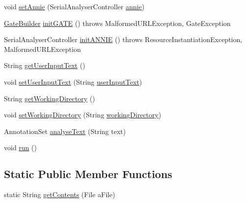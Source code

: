 \begin{DoxyCompactItemize}
\item 
void \hyperlink{classcom_1_1poly_1_1nlp_1_1filekommander_1_1_file_kommander_a806dc8c2cb8521b9d76fb9858ec65085}{set\-Annie} (Serial\-Analyser\-Controller \hyperlink{classcom_1_1poly_1_1nlp_1_1filekommander_1_1_file_kommander_a5c3ff51dc7f068e9442618b7c2ab1810}{annie})
\item 
\hyperlink{classcom_1_1poly_1_1nlp_1_1filekommander_1_1gate_1_1_gate_builder}{Gate\-Builder} \hyperlink{classcom_1_1poly_1_1nlp_1_1filekommander_1_1_file_kommander_a423e5f5fb6b4f6c36f04d1e91de943e6}{init\-G\-A\-T\-E} ()  throws Malformed\-U\-R\-L\-Exception, Gate\-Exception 
\item 
Serial\-Analyser\-Controller \hyperlink{classcom_1_1poly_1_1nlp_1_1filekommander_1_1_file_kommander_aab36d3608bc89c1e99b3db5483641415}{init\-A\-N\-N\-I\-E} ()  throws Resource\-Instantiation\-Exception, Malformed\-U\-R\-L\-Exception 
\item 
String \hyperlink{classcom_1_1poly_1_1nlp_1_1filekommander_1_1_file_kommander_a89817ce8554641ad3cb7c003533a335d}{get\-User\-Input\-Text} ()
\item 
void \hyperlink{classcom_1_1poly_1_1nlp_1_1filekommander_1_1_file_kommander_adf1a1371e27da05aa4f5125b6a3aa33c}{set\-User\-Input\-Text} (String \hyperlink{classcom_1_1poly_1_1nlp_1_1filekommander_1_1_file_kommander_a499151b0f39dbce7b82a811c8cf21402}{user\-Input\-Text})
\item 
String \hyperlink{classcom_1_1poly_1_1nlp_1_1filekommander_1_1_file_kommander_abc3cb01bcd0a28c9e690249a8caf816b}{get\-Working\-Directory} ()
\item 
void \hyperlink{classcom_1_1poly_1_1nlp_1_1filekommander_1_1_file_kommander_a0b72ce095e3d98ae752e6ab9b0b8a1d5}{set\-Working\-Directory} (String \hyperlink{classcom_1_1poly_1_1nlp_1_1filekommander_1_1_file_kommander_a862ebb1796e89d0d83d348797e7c6472}{working\-Directory})
\item 
Annotation\-Set \hyperlink{classcom_1_1poly_1_1nlp_1_1filekommander_1_1_file_kommander_a1cf5ac4a3ebfd468ca38656a9d1bd0b9}{analyse\-Text} (String text)
\item 
void \hyperlink{classcom_1_1poly_1_1nlp_1_1filekommander_1_1_file_kommander_a66c1bfa4914734730a4b47178244c280}{run} ()
\end{DoxyCompactItemize}
\subsection*{Static Public Member Functions}
\begin{DoxyCompactItemize}
\item 
static String \hyperlink{classcom_1_1poly_1_1nlp_1_1filekommander_1_1_file_kommander_a7f90752955db628b0ece37e6355a44b6}{get\-Contents} (File a\-File)
\end{DoxyCompactItemize}
